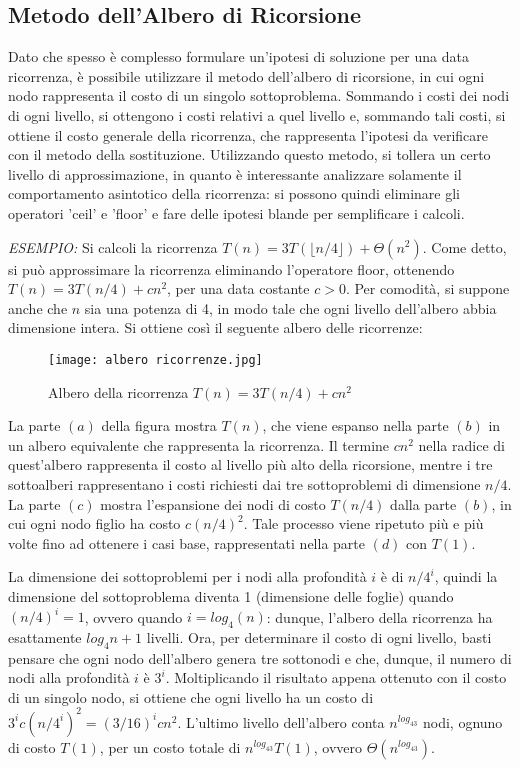 \subsection{Metodo dell'Albero di Ricorsione}
Dato che spesso è complesso formulare un'ipotesi di soluzione per una data ricorrenza, è possibile utilizzare il metodo dell'albero di ricorsione, in cui ogni nodo rappresenta il costo di un singolo sottoproblema. Sommando i costi dei nodi di ogni livello, si ottengono i costi relativi a quel livello e, sommando tali costi, si ottiene il costo generale della ricorrenza, che rappresenta l'ipotesi da verificare con il metodo della sostituzione. Utilizzando questo metodo, si tollera un certo livello di approssimazione, in quanto è interessante analizzare solamente il comportamento asintotico della ricorrenza: si possono quindi eliminare gli operatori 'ceil' e 'floor' e fare delle ipotesi blande per semplificare i calcoli.

\textit{ESEMPIO:} Si calcoli la ricorrenza \(T(n)=3T(\lfloor n/4 \rfloor)+\Theta(n^2)\). Come detto, si può approssimare la ricorrenza eliminando l'operatore floor, ottenendo \(T(n)=3T(n/4)+cn^2\), per una data costante \(c>0\). Per comodità, si suppone anche che \(n\) sia una potenza di 4, in modo tale che ogni livello dell'albero abbia dimensione intera. Si ottiene così il seguente albero delle ricorrenze:

\begin{figure}[!h]
  \centering
  \texttt{[image: albero ricorrenze.jpg]}
  \caption{Albero della ricorrenza \(T(n)=3T(n/4)+cn^2\)}
\end{figure}

La parte \((a)\) della figura mostra \(T(n)\), che viene espanso nella parte \((b)\) in un albero equivalente che rappresenta la ricorrenza. Il termine \(cn^2\) nella radice di quest'albero rappresenta il costo al livello più alto della ricorsione, mentre i tre sottoalberi rappresentano i costi richiesti dai tre sottoproblemi di dimensione \(n/4\). La parte \((c)\) mostra l'espansione dei nodi di costo \(T(n/4)\) dalla parte \((b)\), in cui ogni nodo figlio ha costo \(c(n/4)^2\). Tale processo viene ripetuto più e più volte fino ad ottenere i casi base, rappresentati nella parte \((d)\) con \(T(1)\). 

La dimensione dei sottoproblemi per i nodi alla profondità \(i\) è di \(n/4^i\), quindi la dimensione del sottoproblema diventa 1 (dimensione delle foglie) quando \((n/4)^i=1\), ovvero quando \(i=log_4(n)\): dunque, l'albero della ricorrenza ha esattamente \(log_4n+1\) livelli. Ora, per determinare il costo di ogni livello, basti pensare che ogni nodo dell'albero genera tre sottonodi e che, dunque, il numero di nodi alla profondità \(i\) è \(3^i\). Moltiplicando il risultato appena ottenuto con il costo di un singolo nodo, si ottiene che ogni livello ha un costo di \(3^ic(n/4^i)^2 = (3/16)^icn^2\). L'ultimo livello dell'albero conta \(n^{log_43}\) nodi, ognuno di costo \(T(1)\), per un costo totale di \(n^{log_43}T(1)\), ovvero \(\Theta(n^{log_43})\).

